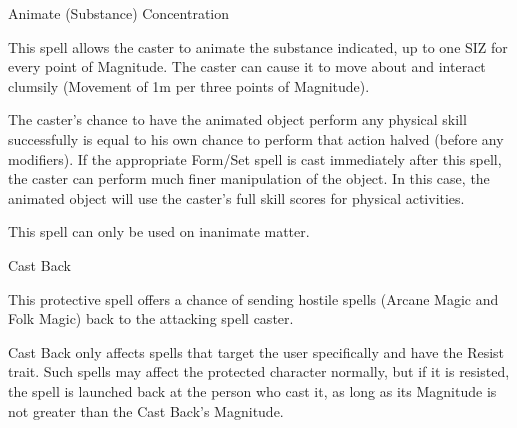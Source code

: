 \begin{rpg-spell}
{Animate (Substance)}
{Concentration}

This spell allows the caster to animate the substance indicated, up to one SIZ for every point of Magnitude. The caster can cause it to move about and interact clumsily (Movement of 1m per three points of Magnitude). 

The caster’s chance to have the animated object perform any physical skill successfully is equal to his own chance to perform that action halved (before any modifiers). If the appropriate Form/Set spell is cast immediately after this spell, the caster can perform much finer manipulation of the object. In this case, the animated object will use the caster’s full skill scores for physical activities. 

This spell can only be used on inanimate matter. 
\end{rpg-spell}


\begin{rpg-spell}
{Cast Back}
{}

This protective spell offers a chance of sending hostile spells (Arcane Magic and Folk Magic) back to the attacking spell caster. 

Cast Back only affects spells that target the user specifically and have the Resist trait. Such spells may affect the protected character normally, but if it is resisted, the spell is launched back at the person who cast it, as long as its Magnitude is not greater than the Cast Back’s Magnitude. 
\end{rpg-spell}



